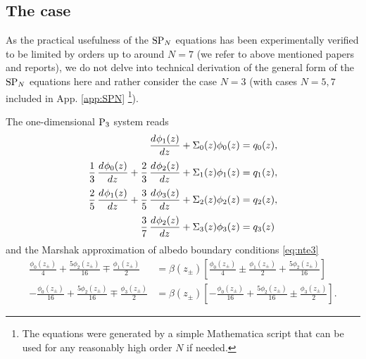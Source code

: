 \subsection{The \SPN[3] case}\label{sec:sp3}
As the practical usefulness of the $\SPN$ equations has been experimentally verified to be limited by orders up
to around $N = 7$ (we refer to above mentioned papers and reports), we do not delve into technical derivation of the
general form of the $\SPN$ equations here and rather consider the case $N=3$ (with cases $N = 5,7$ included in App.
\ref{app:SPN} \footnote{The equations were generated by a simple Mathematica script that can
be used for any reasonably high order $N$ if needed.}). 

The one-dimensional $\PN[3]$ system reads 
\begin{equation}
    \label{eq:P3_1d}
	\begin{aligned}
\der{\phi_1(z)}{z} + \Sigma_{0}(z)\phi_0(z)&=q_0(z),\\[.25em]
\frac{1}{3} \,\der{\phi_0(z)}{z} +
\frac{2}{3} \,\der{\phi_2(z)}{z} + \Sigma_{1}(z)\phi_1(z)&=q_1(z),\\[.25em]
\frac{2}{5} \,\der{\phi_1(z)}{z} + 
\frac{3}{5} \,\der{\phi_3(z)}{z} + \Sigma_{2}(z)\phi_2(z)&=q_2(z),\\[.25em]
\frac{3}{7} \,\der{\phi_2(z)}{z} + \Sigma_{3}(z)\phi_3(z)&=q_3(z)
	\end{aligned}
\end{equation}
and the Marshak approximation of albedo boundary conditions \eqref{eq:nte3}
\begin{equation}\label{eq:Marshak}
\begin{aligned}
\frac{\phi _0(z_{\pm})}{4}+\frac{5 \phi _2(z_{\pm})}{16}\mp\frac{\phi _1(z_{\pm})}{2} &= \beta(z_{\pm})
\left[\frac{\phi _0(z_{\pm})}{4}\pm\frac{\phi _1(z_{\pm})}{2}+\frac{5 \phi _2(z_{\pm})}{16}\right]\\
-\frac{\phi _0(z_{\pm})}{16} +\frac{5 \phi _2(z_{\pm})}{16}\mp\frac{\phi _3(z_{\pm})}{2} &= \beta(z_{\pm})
\left[-\frac{\phi _0(z_{\pm})}{16} +\frac{5 \phi _2(z_{\pm})}{16}\pm\frac{\phi _3(z_{\pm})}{2}\right].
\end{aligned}
\end{equation}


